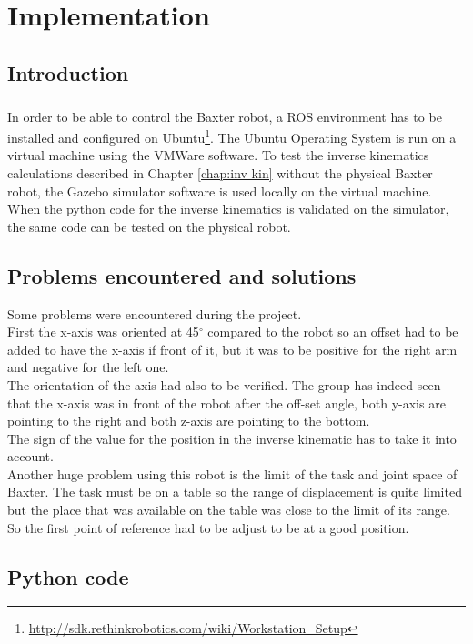 \chapter{Implementation}

\section{Introduction}

\paragraph{}In order to be able to control the Baxter robot, a ROS environment has to be installed and configured on Ubuntu\footnote{\url{http://sdk.rethinkrobotics.com/wiki/Workstation_Setup}}. The Ubuntu Operating System is run on a virtual machine using the VMWare software. To test the inverse kinematics calculations described in Chapter \ref{chap:inv kin} without the physical Baxter robot, the Gazebo simulator software is used locally on the virtual machine. When the python code for the inverse kinematics is validated on the simulator, the same code can be tested on the physical robot. 

\section{Problems encountered and solutions}
Some problems were encountered during the project.\\
First the x-axis was oriented at 45$^\circ$ compared to the robot so an offset had to be added to have the x-axis if front of it, but it was to be positive for the right arm and negative for the left one. \\
The orientation of the axis had also to be verified. The group has indeed seen that the x-axis was in front of the robot after the off-set angle, both y-axis are pointing to the right and both z-axis are pointing to the bottom.\\
The sign of the value for the position in the inverse kinematic has to take it into account.\\
Another huge problem using this robot is the limit of the task and joint space of Baxter.
The task must be on a table so the range of displacement is quite limited but the place that was available on the table was close to the limit of its range. So the first point of reference had to be adjust to be at a good position.

\section{Python code}
